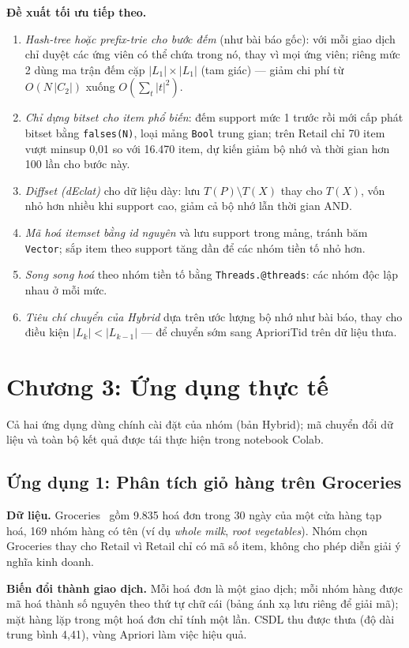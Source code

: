 \documentclass[10pt,twocolumn,letterpaper]{article}
\begin{document}
\textbf{Đề xuất tối ưu tiếp theo.}
\begin{enumerate}
\item \emph{Hash-tree hoặc prefix-trie cho bước đếm} (như bài báo gốc): với mỗi giao dịch chỉ duyệt các ứng viên có thể chứa trong nó, thay vì mọi ứng viên; riêng mức 2 dùng ma trận đếm cặp $|L_1|\times|L_1|$ (tam giác) — giảm chi phí từ $O(N\,|C_2|)$ xuống $O(\sum_t|t|^2)$.
\item \emph{Chỉ dựng bitset cho item phổ biến}: đếm support mức 1 trước rồi mới cấp phát bitset bằng \texttt{falses(N)}, loại mảng \texttt{Bool} trung gian; trên Retail chỉ 70 item vượt minsup 0,01 so với 16{.}470 item, dự kiến giảm bộ nhớ và thời gian hơn 100 lần cho bước này.
\item \emph{Diffset (dEclat)} cho dữ liệu dày: lưu $T(P)\setminus T(X)$ thay cho $T(X)$, vốn nhỏ hơn nhiều khi support cao, giảm cả bộ nhớ lẫn thời gian AND.
\item \emph{Mã hoá itemset bằng id nguyên} và lưu support trong mảng, tránh băm \texttt{Vector}; sắp item theo support tăng dần để các nhóm tiền tố nhỏ hơn.
\item \emph{Song song hoá} theo nhóm tiền tố bằng \texttt{Threads.@threads}: các nhóm độc lập nhau ở mỗi mức.
\item \emph{Tiêu chí chuyển của Hybrid} dựa trên ước lượng bộ nhớ như bài báo, thay cho điều kiện $|L_k|<|L_{k-1}|$ — để chuyển sớm sang AprioriTid trên dữ liệu thưa.
\end{enumerate}

\section{Chương 3: Ứng dụng thực tế}\label{sec:app}
Cả hai ứng dụng dùng chính cài đặt của nhóm (bản Hybrid); mã chuyển đổi dữ liệu và toàn bộ kết quả được tái thực hiện trong notebook Colab.

\subsection{Ứng dụng 1: Phân tích giỏ hàng trên Groceries}
\textbf{Dữ liệu.} Groceries~\cite{hahsler2006} gồm 9{.}835 hoá đơn trong 30 ngày của một cửa hàng tạp hoá, 169 nhóm hàng có tên (ví dụ \textit{whole milk}, \textit{root vegetables}). Nhóm chọn Groceries thay cho Retail vì Retail chỉ có mã số item, không cho phép diễn giải ý nghĩa kinh doanh.

\textbf{Biến đổi thành giao dịch.} Mỗi hoá đơn là một giao dịch; mỗi nhóm hàng được mã hoá thành số nguyên theo thứ tự chữ cái (bảng ánh xạ lưu riêng để giải mã); mặt hàng lặp trong một hoá đơn chỉ tính một lần. CSDL thu được thưa (độ dài trung bình 4,41), vùng Apriori làm việc hiệu quả.
\end{document}

